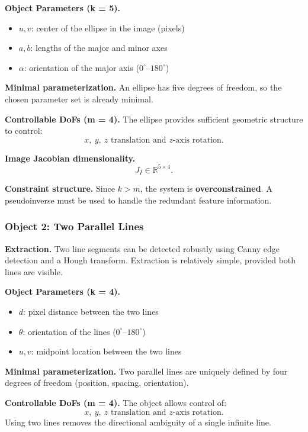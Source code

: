 \documentclass[a4paper,12pt]{article}
\begin{document}
\textbf{Object Parameters (k = 5).}
\begin{itemize}
    \item $u, v$: center of the ellipse in the image (pixels)
    \item $a, b$: lengths of the major and minor axes
    \item $\alpha$: orientation of the major axis ($0^\circ$--$180^\circ$)
\end{itemize}

\textbf{Minimal parameterization.}
An ellipse has five degrees of freedom, so the chosen parameter set is already minimal.

\textbf{Controllable DoFs (m = 4).}
The ellipse provides sufficient geometric structure to control:
\[
x,\ y,\ z \text{ translation and } z\text{-axis rotation}.
\]

\textbf{Image Jacobian dimensionality.}
\[
J_I \in \mathbb{R}^{5 \times 4}.
\]

\textbf{Constraint structure.}
Since $k > m$, the system is \textbf{overconstrained}.
A pseudoinverse must be used to handle the redundant feature information.

\subsubsection*{Object 2: Two Parallel Lines}

\textbf{Extraction.}
Two line segments can be detected robustly using Canny edge detection and a
Hough transform. Extraction is relatively simple, provided both lines are visible.

\textbf{Object Parameters (k = 4).}
\begin{itemize}
    \item $d$: pixel distance between the two lines
    \item $\theta$: orientation of the lines ($0^\circ$--$180^\circ$)
    \item $u, v$: midpoint location between the two lines
\end{itemize}

\textbf{Minimal parameterization.}
Two parallel lines are uniquely defined by four degrees of freedom (position,
spacing, orientation).

\textbf{Controllable DoFs (m = 4).}
The object allows control of:
\[
x,\ y,\ z \text{ translation and } z\text{-axis rotation}.
\]
Using two lines removes the directional ambiguity of a single infinite line.
\end{document}
